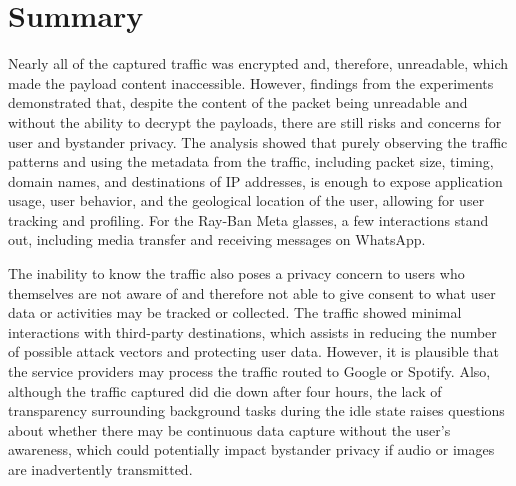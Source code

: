 \section{Summary}
Nearly all of the captured traffic was encrypted and, therefore, unreadable, which made the payload content inaccessible. However, findings from the experiments demonstrated that, despite the content of the packet being unreadable and without the ability to decrypt the payloads, there are still risks and concerns for user and bystander privacy. The analysis showed that purely observing the traffic patterns and using the metadata from the traffic, including packet size, timing, domain names, and destinations of IP addresses, is enough to expose application usage, user behavior, and the geological location of the user, allowing for user tracking and profiling. For the Ray-Ban Meta glasses, a few interactions stand out, including media transfer and receiving messages on WhatsApp.

The inability to know the traffic also poses a privacy concern to users who themselves are not aware of and therefore not able to give consent to what user data or activities may be tracked or collected. The traffic showed minimal interactions with third-party destinations, which assists in reducing the number of possible attack vectors and protecting user data. However, it is plausible that the service providers may process the traffic routed to Google or Spotify. Also, although the traffic captured did die down after four hours, the lack of transparency surrounding background tasks during the idle state raises questions about whether there may be continuous data capture without the user's awareness, which could potentially impact bystander privacy if audio or images are inadvertently transmitted.
